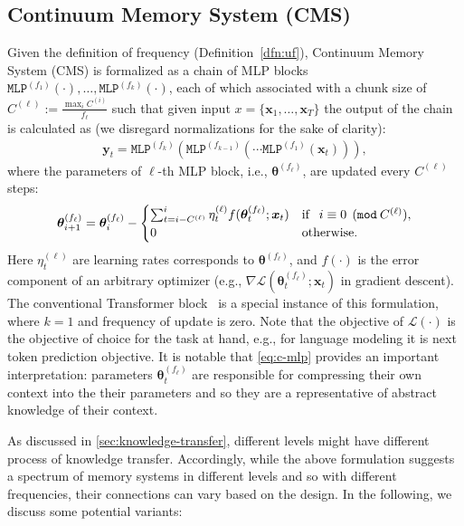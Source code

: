 \documentclass{article}
\newcommand{\citep}{\parencite}
\newcommand{\vx}{\boldsymbol{x}}
\newcommand{\vy}{\boldsymbol{y}}
\begin{document}
{\subsection{Continuum Memory System (CMS)}
Given the definition of frequency (Definition~\ref{dfn:uf}), Continuum Memory System (CMS) is formalized as a chain of MLP blocks $\texttt{MLP}^{(f_1)}(\cdot), \dots, \texttt{MLP}^{(f_k)}(\cdot)$, each of which associated with a chunk size of $C^{(\ell)} := \frac{\max_{i} C^{(i)}}{f_{\ell}}$ such that given input $x = \{\vx_1, \dots, \boldsymbol{x}_T\}$ the output of the chain is calculated as (we disregard normalizations for the sake of clarity):
\begin{align}\label{eq:output-cms}
    \vy_t = \texttt{MLP}^{(f_k)}(\texttt{MLP}^{(f_{k-1})}(\cdots \texttt{MLP}^{(f_1)}(\vx_t))), 
\end{align}
where the parameters of $\ell$-th MLP block, i.e., $\boldsymbol{\theta}^{(f_{\ell})}$, are updated every $C^{(\ell)}$ steps:
\begin{align}\label{eq:c-mlp}
    \boldsymbol{\theta}^{(f_{\ell})}_{i+1} =  \boldsymbol{\theta}^{(f_{\ell})}_i - \begin{cases} \sum_{t = i - C^{(\ell)}}^{i}\eta^{(\ell)}_t f(\boldsymbol{\theta}^{(f_{\ell})}_{t}; \boldsymbol{x}_{t}) & \text{if \:\:} i \equiv 0 \:\: (\texttt{mod} \: C^{(\ell)}), \\ 0 & \text{otherwise}.
    \end{cases}
\end{align}
 Here $\eta^{(\ell)}_t$ are learning rates corresponds to $\boldsymbol{\theta}^{(f_{\ell})}$, and $f(\cdot)$ is the error component of an arbitrary optimizer (e.g., $\nabla \mathcal{L}(\boldsymbol{\theta}^{(f_{\ell})}_{t}; \boldsymbol{x}_t)$ in gradient descent). The conventional Transformer block~\citep{transformers} is a special instance of this formulation, where $k = 1$ and frequency of update is zero. Note that the objective of $\mathcal{L}(\cdot)$ is the objective of choice for the task at hand, e.g., for language modeling it is next token prediction objective. It is notable that \autoref{eq:c-mlp} provides an important interpretation: parameters $\boldsymbol{\theta}^{(f_{\ell})}_{t}$ are responsible for compressing their own context into the their parameters and so they are a representative of abstract knowledge of their context.

As discussed in \autoref{sec:knowledge-transfer}, different levels might have different process of knowledge transfer. Accordingly, while the above formulation suggests a spectrum of memory systems in different levels and so with different frequencies, their connections can vary based on the design. In the following, we discuss some potential variants:

}
\end{document}
